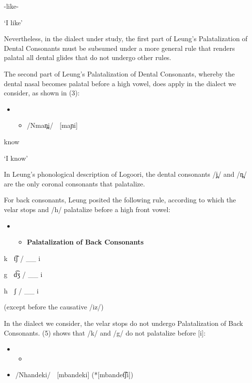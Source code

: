 -like-

\textsc{ ‘I }like’

Nevertheless, in the dialect under study, the first part of Leung’s Palatalization of Dental Consonants must be subsumed under a more general rule that renders palatal all dental glides that do not undergo other rules.

The second part of Leung’s Palatalization of Dental Consonants, whereby the dental nasal becomes palatal before a high vowel, does apply in the dialect we consider, as shown in (3):

\begin{itemize}
\item \setcounter{itemize}{0}
\begin{itemize}
\item /Nman̪i/    [maɲi]    

\end{itemize}
\end{itemize}

know

\textsc{‘I }know’

In Leung’s phonological description of Logoori, the dental consonants /j̪/ and /n̪/ are the only coronal consonants that palatalize.    

For back consonants, Leung posited the following rule, according to which the velar stops and /h/ palatalize before a high front vowel:

\begin{itemize}
\item \setcounter{itemize}{0}
\begin{itemize}
\item \textbf{Palatalization of Back Consonants }\citep[116]{Leung1991}

\end{itemize}
\end{itemize}

k  t͡ʃ / \_\_ i

g  d͡ʒ / \_\_ i

h  ʃ / \_\_ i      

(except before the causative /iz/)

In the dialect we consider, the velar stops do not undergo Palatalization of Back Consonants. (5) shows that /k/ and /g/ do not palatalize before [i]:

\begin{itemize}
\item \setcounter{itemize}{0}
\begin{itemize}
\item \end{itemize}
\end{itemize}
\setcounter{itemize}{0}
\begin{itemize}
\item /Nhandeki/    [mbandeki]  (*[mbandet͡ʃi])  

\end{itemize}

